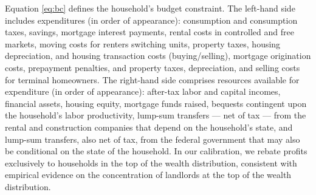 \documentclass[parskip=full]{article}
\begin{document}
Equation \eqref{eq:bc} defines the household's budget constraint. The left-hand side includes expenditures (in order of appearance): consumption and consumption taxes, savings, mortgage interest payments, rental costs in controlled and free markets, moving costs for renters switching units, property taxes, housing depreciation, and housing transaction costs (buying/selling), mortgage origination costs, prepayment penalties, and property taxes, depreciation, and selling costs for terminal homeowners. The right-hand side comprises resources available for expenditure (in order of appearance): after-tax labor and capital incomes, financial assets, housing equity, mortgage funds raised, bequests contingent upon the household's labor productivity, lump-sum transfers — net of tax — from the rental and construction companies that depend on the household's state, and lump-sum transfers, also net of tax, from the federal government that may also be conditional on the state of the household. In our calibration, we rebate profits exclusively to households in the top of the wealth distribution, consistent with empirical evidence on the concentration of landlords at the top of the wealth distribution.
\end{document}
